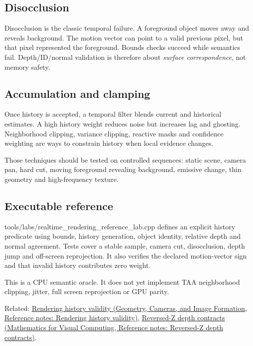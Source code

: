 \subsection{Disocclusion}\label{appendix-e8c352e39466-disocclusion}

Disocclusion is the classic temporal failure. A foreground object moves away and reveals background. The motion vector can point to a valid previous pixel, but that pixel represented the foreground. Bounds checks succeed while semantics fail. Depth/ID/normal validation is therefore about \emph{surface correspondence}, not memory safety.

\subsection{Accumulation and clamping}\label{appendix-e8c352e39466-accumulation-and-clamping}

Once history is accepted, a temporal filter blends current and historical estimates. A high history weight reduces noise but increases lag and ghosting. Neighborhood clipping, variance clipping, reactive masks and confidence weighting are ways to constrain history when local evidence changes.

Those techniques should be tested on controlled sequences: static scene, camera pan, hard cut, moving foreground revealing background, emissive change, thin geometry and high-frequency texture.

\subsection{Executable reference}\label{appendix-e8c352e39466-executable-reference}

tools/labs/realtime\_rendering\_reference\_lab.cpp defines an explicit history predicate using bounds, history generation, object identity, relative depth and normal agreement. Tests cover a stable sample, camera cut, disocclusion, depth jump and off-screen reprojection. It also verifies the declared motion-vector sign and that invalid history contributes zero weight.

This is a CPU semantic oracle. It does not yet implement TAA neighborhood clipping, jitter, full screen reprojection or GPU parity.

Related: \href{../03-Geometry-Cameras-and-Image-Formation/main.pdf\#nameddest=appendix-2e7e9fd28a2c}{Rendering history validity (Geometry, Cameras, and Image Formation, Reference notes: Rendering history validity)}, \href{../02-Mathematics-for-Visual-Computing/main.pdf\#nameddest=appendix-275ec8847057}{Reversed-Z depth contracts (Mathematics for Visual Computing, Reference notes: Reversed-Z depth contracts)}.
